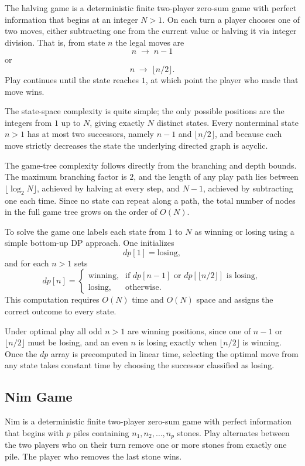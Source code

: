 \documentclass[12pt]{article}
\begin{document}
The halving game is a deterministic finite two-player zero-sum game with perfect information that begins at an integer \(N>1\). On each turn a player chooses one of two moves, either subtracting one from the current value or halving it via integer division. That is, from state \(n\) the legal moves are  
\[
n \;\to\; n-1
\]
or
\[
n \;\to\; \lfloor n/2\rfloor.
\]
Play continues until the state reaches \(1\), at which point the player who made that move wins.

The state-space complexity is quite simple; the only possible positions are the integers from \(1\) up to \(N\), giving exactly \(N\) distinct states. Every nonterminal state \(n>1\) has at most two successors, namely \(n-1\) and \(\lfloor n/2\rfloor\), and because each move strictly decreases the state the underlying directed graph is acyclic.

The game-tree complexity follows directly from the branching and depth bounds. The maximum branching factor is \(2\), and the length of any play path lies between 
\(\lfloor\log_2 N\rfloor\), achieved by halving at every step, and \(N-1\), achieved by subtracting one each time. Since no state can repeat along a path, the total number of nodes in the full game tree grows on the order of \(O(N)\).

To solve the game one labels each state from \(1\) to \(N\) as winning or losing using a simple bottom-up DP approach. One initializes  
\[
dp[1] = \text{losing},
\]
and for each \(n>1\) sets  
\[
dp[n] = 
\begin{cases}
\text{winning}, & \text{if }dp[n-1]\text{ or }dp[\lfloor n/2\rfloor]\text{ is losing},\\
\text{losing}, & \text{otherwise}.
\end{cases}
\]
This computation requires \(O(N)\) time and \(O(N)\) space and assigns the correct outcome to every state.

Under optimal play all odd \(n>1\) are winning positions, since one of \(n-1\) or \(\lfloor n/2\rfloor\) must be losing, and an even \(n\) is losing exactly when \(\lfloor n/2\rfloor\) is winning. Once the \(dp\) array is precomputed in linear time, selecting the optimal move from any state takes constant time by choosing the successor classified as losing.

\subsection{Nim Game}

Nim is a deterministic finite two-player zero-sum game with perfect information that begins with \(p\) piles containing \(n_1, n_2, \dots, n_p\) stones. Play alternates between the two players who on their turn remove one or more stones from exactly one pile. The player who removes the last stone wins.
\end{document}
